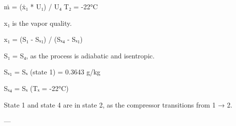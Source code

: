 ṁ = (ẋ₁ * U₁) / U₄  
T₂ = -22°C  

x₁ is the vapor quality.  

x₁ = (S₁ - Sₓ₁) / (Sₓ₄ - Sₓ₁)  

S₁ = S₄, as the process is adiabatic and isentropic.  

Sₓ₁ = Sₓ (state 1) = 0.3643 g/kg  

Sₓ₄ = Sₓ (Tₓ = -22°C)  

State 1 and state 4 are in state 2, as the compressor transitions from 1 → 2.  

---